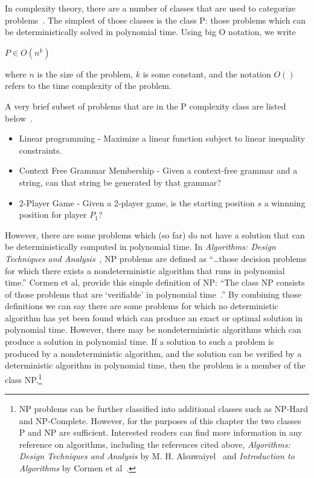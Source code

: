 In complexity theory, there are a number of classes that are used to categorize
problems~\cite{alsuwaiyel1999algorithms,Cormen:2009:IAT:1614191}. The simplest
of those classes is the class P: those problems which can be deterministically
solved in polynomial time. Using big O notation, we write

\(P \in O(n^{k})\)

where \(n\) is the size of the problem, \(k\) is some constant, and the
notation \(O()\) refers to the time complexity of the problem.

A very brief subset of problems that are in the P complexity class are listed
below~\cite{greenlaw1991compendium}.

\begin{itemize}
\item{Linear programming - Maximize a linear function subject to linear
inequality constraints.} 
\item{Context Free Grammar Membership - Given a context-free grammar and a
string, can that string be generated by that grammar?}
\item {2-Player Game - Given a 2-player game, is the starting position \(s\) a
winnning position for player \(P_1\)?}
\end{itemize}

However, there are some problems which (so far) do not have a solution that can
be deterministically computed in polynomial time. In \emph{Algorithms: Design
Techniques and Analysis}~\cite{alsuwaiyel1999algorithms}, NP problems are
defined as ``\ldots those decision problems for which there exists a
nondeterministic algorithm that runs in polynomial time.'' Cormen et al, provide
this simple definition of NP: ``The class NP consists of those problems that are
`verifiable' in polynomial time~\cite{Cormen:2009:IAT:1614191}.'' By combining
those definitions we can say there are some problems for which no deterministic
algorithm has yet been found which can produce an exact or optimal solution in
polynomial time. However, there may be nondeterministic algorithms which can
produce a solution in polynomial time. If a solution to such a problem is
produced by a nondeterministic algorithm, and the solution can be verified by a
deterministic algorithm in polynomial time, then the problem is a member of the
class NP.\footnote{NP problems can be further classified into additional
classes such as NP-Hard and NP-Complete. However, for the purposes of this
chapter the two classes P and NP are sufficient. Interested readers can find
more information in any reference on algorithms, including the references cited
above, \emph{Algorithms: Design Techniques and Analysis} by M. H.
Alsuwaiyel~\cite{alsuwaiyel1999algorithms} and \emph{Introduction to Algorithms}
by Cormen et al~\cite{Cormen:2009:IAT:1614191}.}

